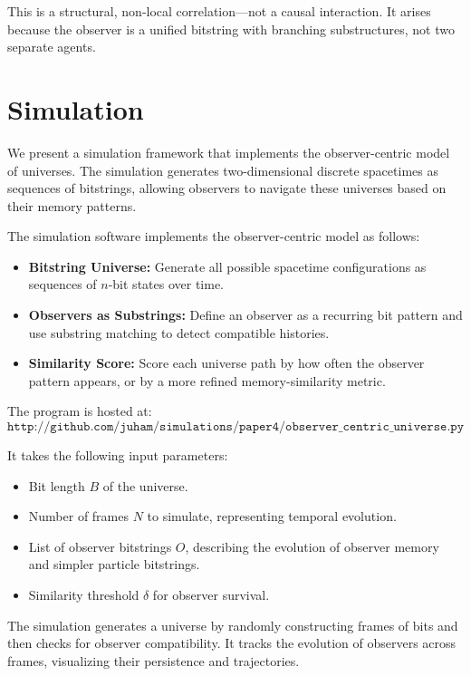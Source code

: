 \documentclass[12pt]{article}
\begin{document}
This is a structural, non-local correlation—not a causal interaction. It arises because the observer is a unified bitstring with branching substructures, not two separate agents.

\section{Simulation}

We present a simulation framework that implements the observer-centric model of universes. The simulation generates two-dimensional discrete spacetimes as sequences of bitstrings, allowing observers to navigate these universes based on their memory patterns.

The simulation software implements the observer-centric model as follows:

\begin{itemize}
    \item \textbf{Bitstring Universe:} Generate all possible spacetime configurations as sequences of $n$-bit states over time.
    \item \textbf{Observers as Substrings:} Define an observer as a recurring bit pattern and use substring matching to detect compatible histories.
    \item \textbf{Similarity Score:} Score each universe path by how often the observer pattern appears, or by a more refined memory-similarity metric.
\end{itemize}

The program is hosted at:
\[
    \texttt{http://github.com/juham/simulations/paper4/observer\_centric\_universe.py}
\]

It takes the following input parameters:

\begin{itemize}
    \item Bit length $B$ of the universe.
    \item Number of frames $N$ to simulate, representing temporal evolution.
    \item List of observer bitstrings $O$, describing the evolution of observer memory and simpler particle bitstrings.
    \item Similarity threshold $\delta$ for observer survival.
\end{itemize}

The simulation generates a universe by randomly constructing frames of bits and then checks for observer compatibility. It tracks the evolution of observers across frames, visualizing their persistence and trajectories.
\end{document}
